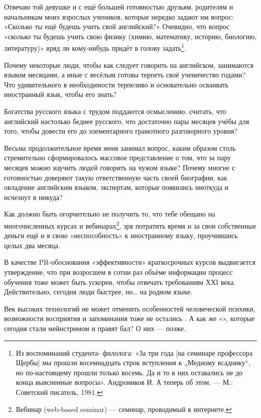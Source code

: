 Отвечаю той девушке и с ещё большей готовностью друзьям, родителям и начальникам моих взрослых учеников, которые нередко задают им вопрос: «Сколько ты ещё будешь учить свой английский?» Очевидно, что вопрос «сколько ты будешь учить свою физику (химию, математику, историю, биологию, литературу)» вряд ли кому-нибудь придёт в голову задать\footnote{
Из воспоминаний студента- филолога: «За три года [на семинаре профессора Щербы] мы прошли восемнадцать строк вступления к „Медному всаднику“, но по-настоящему прошли только восемь. Да и то в них оставались не до конца выясненные вопросы». Андроников И. А теперь об этом. — М.: Советский писатель, 1981.}.

Почему некоторые люди, чтобы как следует говорить на английском,  занимаются языком месяцами, а иные с весёлым  готовы терпеть своё ученичество годами? Что удивительного в необходимости терпеливо и основательно осваивать иностранный язык, чтобы его знать?

Богатства русского языка с трудом поддаются осмыслению.  считать, что английский настолько беднее русского, что достаточно пары месяцев учёбы для того, чтобы довести его до элементарного грамотного разговорного уровня?

Весьма продолжительное время меня занимал вопрос, каким образом столь стремительно сформировалось массовое представление о том, что за пару месяцев можно научить людей говорить на чужом языке? Почему многие с готовностью доверяют такую ответственную часть своей биографии, как овладение английским языком,  экспертам, которые появились ниоткуда и исчезнут в никуда?

Как должно быть огорчительно не получить то, что тебе обещано на многочисленных курсах и вебинарах\footnote{Вебинар (web-based seminar) — семинар, проводимый в интернете.}, зря потратить время и за свои собственные деньги ещё и  в свою «неспособность» к иностранному языку, проучившись целых два месяца.

В качестве PR-обоснования «эффективности» краткосрочных курсов выдвигается утверждение, что при возросшем в сотни раз объёме информации процесс обучения тоже может быть ускорен, чтобы отвечать требованиям ХХI века. Действительно, сегодня люди  быстрее, но… на родном языке.

Век высоких технологий не может отменить особенностей человеческой психики, возможности восприятия и запоминания тоже не остались . А как же «», которые сегодня стали мейнстримом и правят бал? О них — позже.

